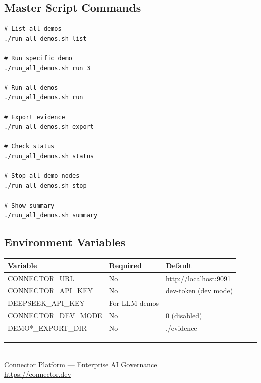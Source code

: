 \documentclass[11pt,a4paper]{article}
\begin{document}
\subsection{Master Script Commands}

\begin{lstlisting}
# List all demos
./run_all_demos.sh list

# Run specific demo
./run_all_demos.sh run 3

# Run all demos
./run_all_demos.sh run

# Export evidence
./run_all_demos.sh export

# Check status
./run_all_demos.sh status

# Stop all demo nodes
./run_all_demos.sh stop

# Show summary
./run_all_demos.sh summary
\end{lstlisting}

\subsection{Environment Variables}

\begin{tabular}{lll}
\toprule
\textbf{Variable} & \textbf{Required} & \textbf{Default} \\
\midrule
CONNECTOR\_URL & No & http://localhost:9091 \\
CONNECTOR\_API\_KEY & No & dev-token (dev mode) \\
DEEPSEEK\_API\_KEY & For LLM demos & --- \\
CONNECTOR\_DEV\_MODE & No & 0 (disabled) \\
DEMO*\_EXPORT\_DIR & No & ./evidence \\
\bottomrule
\end{tabular}

\vfill
\begin{center}
\textcolor{connectorgreen}{\rule{0.5\textwidth}{0.5pt}}\\[1em]
{\small Connector Platform --- Enterprise AI Governance}\\
{\small \url{https://connector.dev}}
\end{center}
\end{document}
